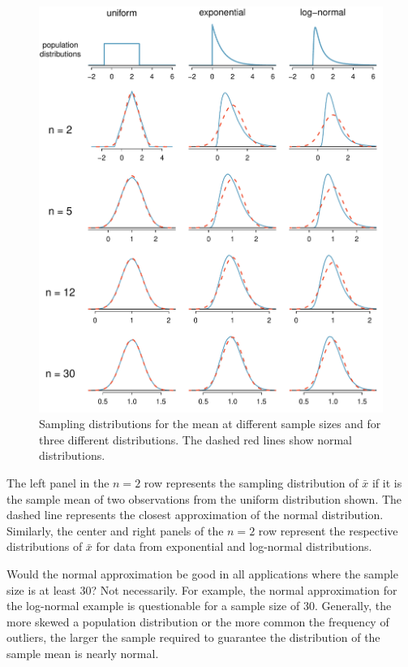 \begin{figure}
   \centering
   \includegraphics[width=\textwidth]{ch_inference_foundations/figures/cltSimulations/cltSimulations}
   \caption{Sampling distributions for the mean at different sample sizes and for three different distributions. The dashed red lines show normal distributions.}
   \label{cltSimulations}
\end{figure}

The left panel in the $n=2$ row represents the sampling distribution of $\bar{x}$ if it is the sample mean of two observations from the uniform distribution shown. The dashed line represents the closest approximation of the normal distribution. Similarly, the center and right panels of the $n=2$ row represent the respective distributions of $\bar{x}$ for data from exponential and log-normal distributions.

\begin{example}{Would the normal approximation be good in all applications where the sample size is at least 30?}
Not necessarily. For example, the normal approximation for the log-normal example is questionable for a sample size of 30. Generally, the more skewed a population distribution or the more common the frequency of outliers, the larger the sample required to guarantee the distribution of the sample mean is nearly normal.
\end{example}

